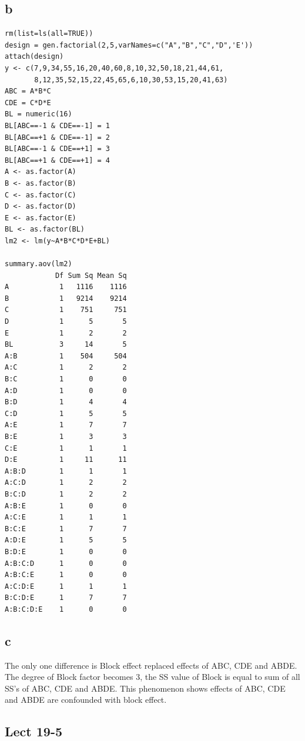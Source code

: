\documentclass[11pt,letterpaper]{article}
\begin{document}
\subsection*{b}
\begin{verbatim}
rm(list=ls(all=TRUE))
design = gen.factorial(2,5,varNames=c("A","B","C","D",'E'))
attach(design)
y <- c(7,9,34,55,16,20,40,60,8,10,32,50,18,21,44,61,
       8,12,35,52,15,22,45,65,6,10,30,53,15,20,41,63)
ABC = A*B*C 
CDE = C*D*E
BL = numeric(16)
BL[ABC==-1 & CDE==-1] = 1
BL[ABC==+1 & CDE==-1] = 2
BL[ABC==-1 & CDE==+1] = 3
BL[ABC==+1 & CDE==+1] = 4
A <- as.factor(A)
B <- as.factor(B)
C <- as.factor(C)
D <- as.factor(D)
E <- as.factor(E)
BL <- as.factor(BL)
lm2 <- lm(y~A*B*C*D*E+BL)

summary.aov(lm2)
            Df Sum Sq Mean Sq
A            1   1116    1116
B            1   9214    9214
C            1    751     751
D            1      5       5
E            1      2       2
BL           3     14       5
A:B          1    504     504
A:C          1      2       2
B:C          1      0       0
A:D          1      0       0
B:D          1      4       4
C:D          1      5       5
A:E          1      7       7
B:E          1      3       3
C:E          1      1       1
D:E          1     11      11
A:B:D        1      1       1
A:C:D        1      2       2
B:C:D        1      2       2
A:B:E        1      0       0
A:C:E        1      1       1
B:C:E        1      7       7
A:D:E        1      5       5
B:D:E        1      0       0
A:B:C:D      1      0       0
A:B:C:E      1      0       0
A:C:D:E      1      1       1
B:C:D:E      1      7       7
A:B:C:D:E    1      0       0
\end{verbatim}

\subsection*{c}
\noindent The only one difference is Block effect replaced effects of ABC, CDE and ABDE. The degree of Block factor becomes 3, the SS value of Block is equal to sum of all SS's of ABC, CDE and ABDE. This phenomenon shows effects of ABC, CDE and ABDE are confounded with block effect. 

\newpage
\subsection*{Lect 19-5}
\end{document}
